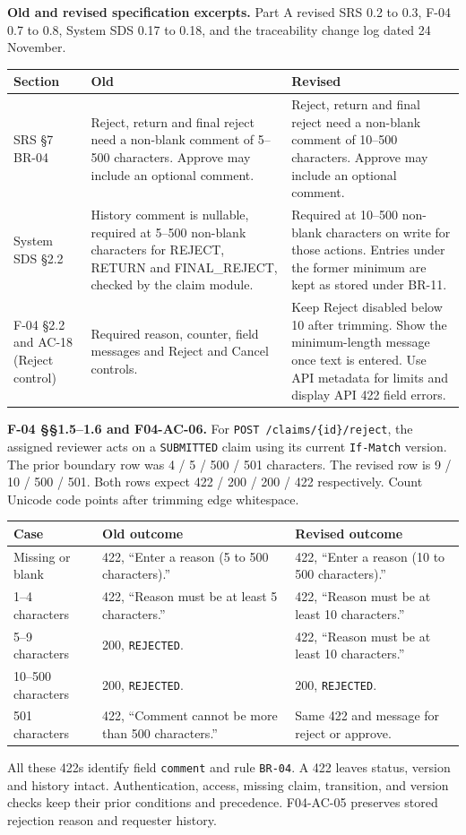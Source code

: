 \textbf{Old and revised specification excerpts.}
Part A revised SRS 0.2 to 0.3, F-04 0.7 to 0.8, System SDS 0.17 to 0.18, and the traceability change log dated 24 November.
\begin{longtable}{@{}R{3.1cm}R{6.4cm}R{6.4cm}@{}}
\toprule
\textbf{Section} & \textbf{Old} & \textbf{Revised} \\ \midrule \endhead
SRS \S7 BR-04 & Reject, return and final reject need a non-blank comment of 5--500 characters. Approve may include an optional comment. & Reject, return and final reject need a non-blank comment of 10--500 characters. Approve may include an optional comment. \\
System SDS \S2.2 & History comment is nullable, required at 5--500 non-blank characters for REJECT, RETURN and FINAL\_REJECT, checked by the claim module. & Required at 10--500 non-blank characters on write for those actions. Entries under the former minimum are kept as stored under BR-11. \\
F-04 \S2.2 and AC-18 (Reject control) & Required reason, counter, field messages and Reject and Cancel controls. & Keep Reject disabled below 10 after trimming. Show the minimum-length message once text is entered. Use API metadata for limits and display API 422 field errors. \\
\bottomrule
\end{longtable}

\clearpage
{}
\label{ev:contract-review}
\textbf{F-04 \S\S1.5--1.6 and F04-AC-06.}
For \texttt{POST /claims/\{id\}/reject}, the assigned reviewer acts on a \texttt{SUBMITTED} claim using its current \texttt{If-Match} version. The prior boundary row was 4 / 5 / 500 / 501 characters. The revised row is 9 / 10 / 500 / 501. Both rows expect 422 / 200 / 200 / 422 respectively. Count Unicode code points after trimming edge whitespace.

\begin{longtable}{@{}R{3.1cm}R{6.4cm}R{6.4cm}@{}}
\toprule
\textbf{Case} & \textbf{Old outcome} & \textbf{Revised outcome} \\ \midrule \endhead
Missing or blank & 422, “Enter a reason (5 to 500 characters).” & 422, “Enter a reason (10 to 500 characters).” \\
1--4 characters & 422, “Reason must be at least 5 characters.” & 422, “Reason must be at least 10 characters.” \\
5--9 characters & 200, \texttt{REJECTED}. & 422, “Reason must be at least 10 characters.” \\
10--500 characters & 200, \texttt{REJECTED}. & 200, \texttt{REJECTED}. \\
501 characters & 422, “Comment cannot be more than 500 characters.” & Same 422 and message for reject or approve. \\
\bottomrule
\end{longtable}
All these 422s identify field \texttt{comment} and rule \texttt{BR-04}. A 422 leaves status, version and history intact. Authentication, access, missing claim, transition, and version checks keep their prior conditions and precedence. F04-AC-05 preserves stored rejection reason and requester history.

